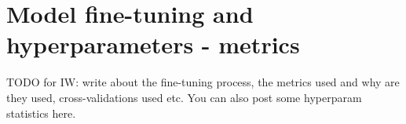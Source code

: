 
\chapter{Model fine-tuning and hyperparameters - metrics}

TODO for IW: write about the fine-tuning process, the metrics used and why are they used, cross-validations used etc. You can also post some hyperparam statistics here.